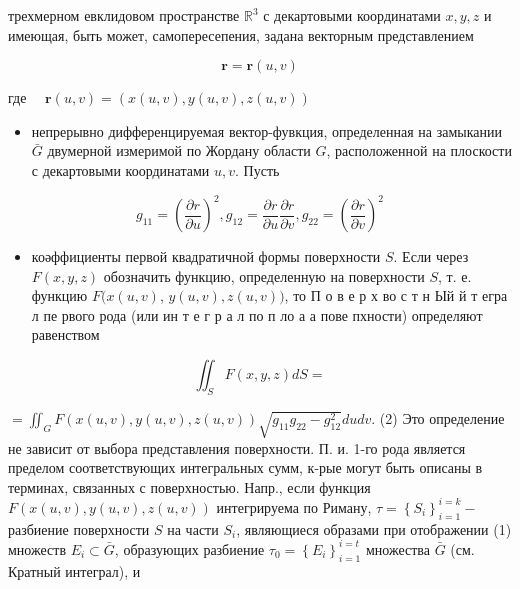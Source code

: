 \documentclass[10pt]{article}
\begin{document}
трехмерном евклидовом пространстве $\mathbb{R}^{3}$ с декартовыми координатами $x, y, z$ и имеющая, быть может, самопересепения, задана векторным представлением



\[

\boldsymbol{r}=\boldsymbol{r}(u, v)

\]



где $\quad \boldsymbol{r}(u, v)=(x(u, v), y(u, v), z(u, v))$



\begin{itemize}

  \item непрерывно дифференцируемая вектор-фувкция, определенная на замыкании $\bar{G}$ двумерной измеримой по Жордану области $G$, расположенной на плоскости с декартовыми координатами $u, v$. Пусть

\end{itemize}



\[

g_{11}=\left(\frac{\partial r}{\partial u}\right)^{2}, g_{12}=\frac{\partial r}{\partial u} \frac{\partial r}{\partial v}, g_{22}=\left(\frac{\partial r}{\partial v}\right)^{2}

\]



\begin{itemize}

  \item коәффициенты первой квадратичной формы поверхности $S$. Если через $F(x, y, z)$ обозначить функцию, определенную на поверхности $S$, т. е. функцию $F(x(u, v)$, $y(u, v), z(u, v))$, то П о в е р х во с т н Ый й т егра л пе рвого рода (или ин т е г р а л по п ло а а пове пхности) определяют равенством

\end{itemize}



\[

\iint_{S} F(x, y, z) d S=

\]



$=\iint_{G} F(x(u, v), y(u, v), z(u, v)) \sqrt{g_{11} g_{22}-g_{12}^{2}} d u d v$. (2) Это определение не зависит от выбора представления поверхности. П. и. 1-го рода является пределом соответствующих интегральных сумм, к-рые могут быть описаны в терминах, связанных с поверхностью. Напр., если функция $F(x(u, v), y(u, v), z(u, v))$ интегрируема по Риману, $\tau=\left\{S_{i}\right\}_{i=1}^{i=k}-$ разбиение поверхности $S$ на части $S_{i}$, являющиеся образами при отображении (1) множеств $E_{i} \subset \bar{G}$, образующих разбиение $\tau_{0}=\left\{E_{i}\right\}_{i=1}^{i=t}$ множества $\bar{G}$ (см. Кратный интеграл), и
\end{document}
